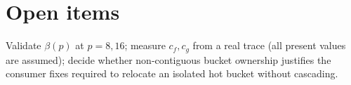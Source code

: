 \documentclass[11pt]{article}
\begin{document}
\section{Open items}
Validate $\beta(p)$ at $p=8,16$; measure $c_f,c_g$ from a real trace (all present values are
assumed); decide whether non-contiguous bucket ownership justifies the consumer fixes required
to relocate an isolated hot bucket without cascading.
\end{document}
